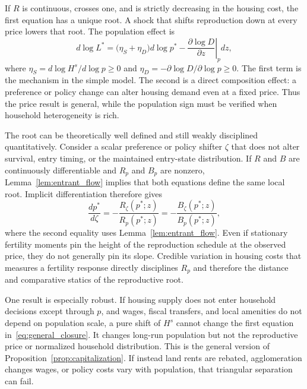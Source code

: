 \documentclass[11pt]{article}
\theoremstyle{definition}
\begin{document}
If $R$ is continuous, crosses one, and is strictly decreasing in the housing
cost, the first equation has a unique root. A shock that shifts reproduction
down at every price lowers that root. The population effect is
\begin{equation}
 d\log L^*
 =\bigl(\eta_S+\eta_D\bigr)d\log p^*
 -\left.\frac{\partial\log D}{\partial z}\right|_{p}dz,
 \label{eq:general_population_change}
\end{equation}
where $\eta_S=d\log H^s/d\log p\geq0$ and
$\eta_D=-\partial\log D/\partial\log p\geq0$. The first term is the mechanism
in the simple model. The second is a direct composition effect: a preference
or policy change can alter housing demand even at a fixed price. Thus the price
result is general, while the population sign must be verified when household
heterogeneity is rich.

The root can be theoretically well defined and still weakly disciplined
quantitatively. Consider a scalar preference or policy shifter $\zeta$ that does
not alter survival, entry timing, or the maintained entry-state distribution.
If $R$ and $B$ are continuously differentiable and $R_p$ and $B_p$ are nonzero,
Lemma~\ref{lem:entrant_flow} implies that both equations define the same local
root. Implicit differentiation therefore gives
\begin{equation}
 \frac{dp^*}{d\zeta}
 =-\frac{R_\zeta(p^*;z)}{R_p(p^*;z)}
 =-\frac{B_\zeta(p^*;z)}{B_p(p^*;z)},
 \label{eq:root_identification}
\end{equation}
where the second equality uses Lemma~\ref{lem:entrant_flow}. Even if stationary
fertility moments pin the height of the reproduction schedule at the observed
price, they do not generally pin its slope. Credible variation in housing costs
that measures a fertility response directly disciplines $R_p$ and therefore
the distance and comparative statics of the reproductive root.

One result is especially robust. If housing supply does not enter household
decisions except through $p$, and wages, fiscal transfers, and local amenities
do not depend on population scale, a pure shift of $H^s$ cannot change the
first equation in~\eqref{eq:general_closure}. It changes long-run population
but not the reproductive price or normalized household distribution. This is
the general version of Proposition~\ref{prop:capitalization}. If instead land
rents are rebated, agglomeration changes wages, or policy costs vary with
population, that triangular separation can fail.
\end{document}
